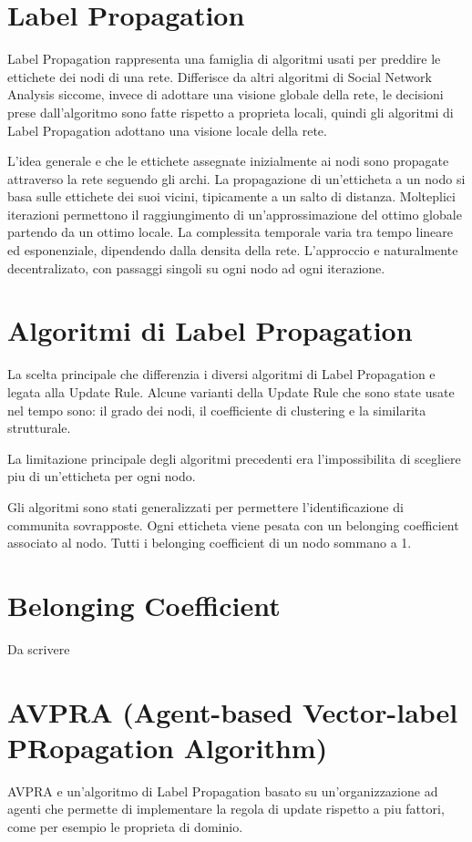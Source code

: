 \documentclass[a4paper,12pt]{report}
\begin{document}
	\section{Label Propagation}
	Label Propagation rappresenta una famiglia di algoritmi usati per preddire le ettichete dei nodi di una rete. 
	Differisce da altri algoritmi di Social Network Analysis siccome, invece di adottare una visione globale della rete, le decisioni prese dall'algoritmo sono fatte rispetto a proprieta locali, quindi gli algoritmi di Label Propagation adottano una visione locale della rete. \cite{raghavan} 

	L'idea generale e che le ettichete assegnate inizialmente ai nodi sono propagate attraverso la rete seguendo gli archi. La propagazione di un'etticheta a un nodo si basa sulle ettichete dei suoi vicini, tipicamente a un salto di distanza. Molteplici iterazioni permettono il raggiungimento di un'approssimazione del ottimo globale partendo da un ottimo locale. La complessita temporale varia tra tempo lineare ed esponenziale, dipendendo dalla densita della rete. L'approccio e naturalmente decentralizato, con passaggi singoli su ogni nodo ad ogni iterazione. \cite{avpra}
	
	\section{Algoritmi di Label Propagation}
	La scelta principale che differenzia i diversi algoritmi di Label Propagation e legata alla Update Rule. Alcune varianti della Update Rule che sono state usate nel tempo sono: il grado dei nodi, il coefficiente di clustering e la similarita strutturale.

	La limitazione principale degli algoritmi precedenti era l'impossibilita di scegliere piu di un'etticheta per ogni nodo. 

	Gli algoritmi sono stati generalizzati per permettere l'identificazione di communita sovrapposte. Ogni etticheta viene pesata con un belonging coefficient associato al nodo. Tutti i belonging coefficient di un nodo sommano a 1. 

	\section{Belonging Coefficient}
	Da scrivere	

	\section{AVPRA (Agent-based Vector-label PRopagation Algorithm)}
	AVPRA e un'algoritmo di Label Propagation basato su un'organizzazione ad agenti che permette di implementare la regola di update rispetto a piu fattori, come per esempio le proprieta di dominio. 
\end{document}

